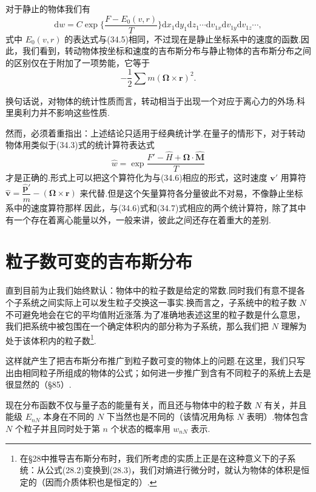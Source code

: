 对于静止的物体我们有
\begin{equation}
  \mathrm{d}w=C\exp\bigg\{\frac{F-E_0(v,r)}{T}\bigg\}
  \mathrm{d}x_1\mathrm{d}y_1\mathrm{d}z_1\cdots\mathrm{d}v_{1x}\mathrm{d}v_{1y}\mathrm{d}v_{1z}\cdots,
\end{equation}
式中 $E_0(v,r)$ 的表达式与(34.5)相同，不过现在是静止坐标系中的速度的函数.因此，我们看到，转动物体按坐标和速度的吉布斯分布与静止物体的吉布斯分布之间的区别仅在于附加了一项势能，它等于
\begin{equation*}
  -\frac{1}{2}\sum m\left(\boldsymbol{\Omega}\times\boldsymbol{r}\right)^2.
\end{equation*}

换句话说，对物体的统计性质而言，转动相当于出现一个对应于离心力的外场.科里奥利力并不影响这些性质.

然而，必须着重指出：上述结论只适用于经典统计学.在量子的情形下，对于转动物体用类似于(34.3)式的统计算符表达式
\begin{equation}
  \hat{w}=\exp\frac{F'-\hat{H}+\boldsymbol{\Omega}\cdot\hat{\boldsymbol{M}}}{T}
\end{equation}
才是正确的.形式上可以把这个算符化为与(34.6)相应的形式，这时速度 $\boldsymbol{v}'$ 用算符 $\hat{\boldsymbol{v}}=\dfrac{\hat{\boldsymbol{p}}'}{m}-\left(\boldsymbol{\Omega}\times\boldsymbol{r}\right)$ 来代替.但是这个矢量算符各分量彼此不对易，不像静止坐标系中的速度算符那样.因此，与(34.6)式和(34.7)式相应的两个统计算符，除了其中有一个存在着离心能量以外，一般来讲，彼此之间还存在着重大的差别.

\section{粒子数可变的吉布斯分布}

直到目前为止我们始终默认：物体中的粒子数是给定的常数.同时我们有意不提各个子系统之间实际上可以发生粒子交换这一事实.换而言之，子系统中的粒子数 $N$ 不可避免地会在它的平均值附近涨落.为了准确地表述这里的粒子数是什么意思，我们把系统中被包围在一个确定体积内的部分称为子系统，那么我们把 $N$ 理解为处于该体积内的粒子数\footnote{在§28中推导吉布斯分布时，我们所考虑的实质上正是在这种意义下的子系统：从公式(28.2)变换到(28.3)，我们对熵进行微分时，就认为物体的体积是恒定的（因而介质体积也是恒定的）.}.

这样就产生了把吉布斯分布推广到粒子数可变的物体上的问题.在这里，我们只写出由相同粒子所组成的物体的公式；如何进一步推广到含有不同粒子的系统上去是很显然的（§85）.

现在分布函数不仅与量子态的能量有关，而且还与物体中的粒子数 $N$ 有关，并且能级 $E_{nN}$ 本身在不同的 $N$ 下当然也是不同的（该情况用角标 $N$ 表明）.物体包含 $N$ 个粒子并且同时处于第 $n$ 个状态的概率用 $w_{nN}$ 表示.

